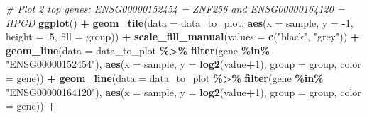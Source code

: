 \documentclass[
]{article}
\newenvironment{Shaded}{\begin{snugshade}}{\end{snugshade}}
\newcommand{\AttributeTok}[1]{\textcolor[rgb]{0.13,0.29,0.53}{#1}}
\newcommand{\CommentTok}[1]{\textcolor[rgb]{0.56,0.35,0.01}{\textit{#1}}}
\newcommand{\DecValTok}[1]{\textcolor[rgb]{0.00,0.00,0.81}{#1}}
\newcommand{\FunctionTok}[1]{\textcolor[rgb]{0.13,0.29,0.53}{\textbf{#1}}}
\newcommand{\NormalTok}[1]{#1}
\newcommand{\SpecialCharTok}[1]{\textcolor[rgb]{0.81,0.36,0.00}{\textbf{#1}}}
\newcommand{\StringTok}[1]{\textcolor[rgb]{0.31,0.60,0.02}{#1}}
\begin{document}
\begin{Shaded}
\begin{Highlighting}[]
\CommentTok{\# Plot 2 top genes: ENSG00000152454 = ZNF256 and ENSG00000164120 = HPGD}
\FunctionTok{ggplot}\NormalTok{() }\SpecialCharTok{+}
  \FunctionTok{geom\_tile}\NormalTok{(}\AttributeTok{data =}\NormalTok{ data\_to\_plot, }\FunctionTok{aes}\NormalTok{(}\AttributeTok{x =}\NormalTok{ sample, }\AttributeTok{y =} \SpecialCharTok{{-}}\DecValTok{1}\NormalTok{, }\AttributeTok{height =}\NormalTok{ .}\DecValTok{5}\NormalTok{, }\AttributeTok{fill =}\NormalTok{ group)) }\SpecialCharTok{+}
  \FunctionTok{scale\_fill\_manual}\NormalTok{(}\AttributeTok{values =} \FunctionTok{c}\NormalTok{(}\StringTok{"black"}\NormalTok{, }\StringTok{"grey"}\NormalTok{)) }\SpecialCharTok{+}
  \FunctionTok{geom\_line}\NormalTok{(}\AttributeTok{data =}\NormalTok{ data\_to\_plot }\SpecialCharTok{\%\textgreater{}\%} \FunctionTok{filter}\NormalTok{(gene }\SpecialCharTok{\%in\%} \StringTok{"ENSG00000152454"}\NormalTok{),}
            \FunctionTok{aes}\NormalTok{(}\AttributeTok{x =}\NormalTok{ sample, }\AttributeTok{y =} \FunctionTok{log2}\NormalTok{(value}\SpecialCharTok{+}\DecValTok{1}\NormalTok{), }\AttributeTok{group =}\NormalTok{ group, }\AttributeTok{color =}\NormalTok{ gene)) }\SpecialCharTok{+}
  \FunctionTok{geom\_line}\NormalTok{(}\AttributeTok{data =}\NormalTok{ data\_to\_plot }\SpecialCharTok{\%\textgreater{}\%} \FunctionTok{filter}\NormalTok{(gene }\SpecialCharTok{\%in\%} \StringTok{"ENSG00000164120"}\NormalTok{),}
            \FunctionTok{aes}\NormalTok{(}\AttributeTok{x =}\NormalTok{ sample, }\AttributeTok{y =} \FunctionTok{log2}\NormalTok{(value}\SpecialCharTok{+}\DecValTok{1}\NormalTok{), }\AttributeTok{group =}\NormalTok{ group, }\AttributeTok{color =}\NormalTok{ gene)) }\SpecialCharTok{+}
  

\end{Highlighting}
\end{Shaded}
\end{document}
